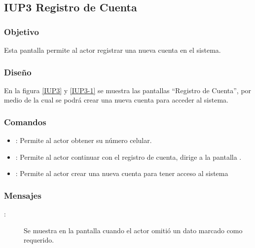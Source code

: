 \subsection{IUP3 Registro de Cuenta}
 
\subsubsection{Objetivo}

    Esta pantalla permite al actor registrar una nueva cuenta en el sistema.

\subsubsection{Diseño}

    En la figura \ref{IUP3} y \ref{IUP3-1}  se muestra las pantallas ``Registro de Cuenta'', por medio de la cual se podrá crear una nueva cuenta para  acceder al sistema. \\


\subsubsection{Comandos}
\begin{itemize}
    \item {}: Permite al actor obtener su número celular.
    \item {}: Permite al actor continuar con el registro de cuenta, dirige a la pantalla .
    \item {}: Permite al actor crear una nueva cuenta para tener acceso al sistema
    
\end{itemize}

\subsubsection{Mensajes}

\begin{description}
    \item[:] Se muestra en la pantalla  cuando el actor omitió un dato marcado como requerido.
    
\end{description}
